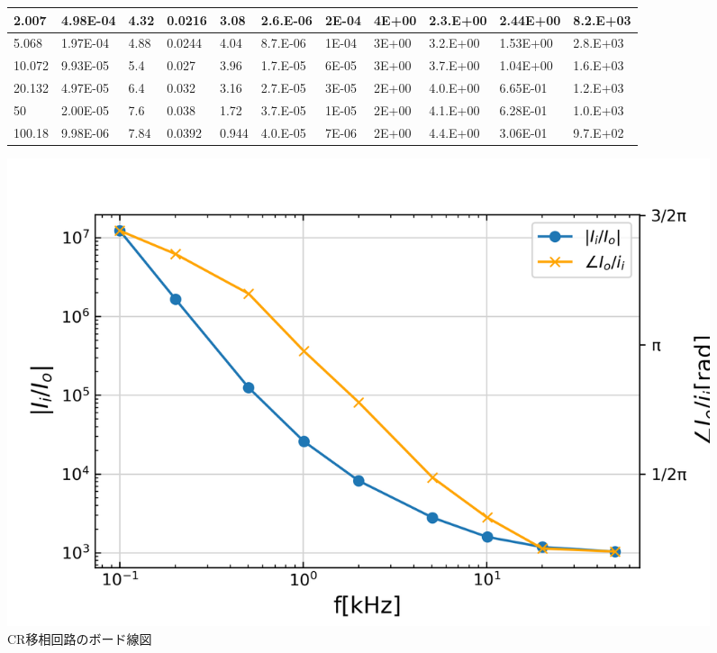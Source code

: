 \documentclass[10pt, a4j, dvipdfmx]{jarticle}
\makeatletter
\newcommand{\figcaption}[1]{\def\@captype{figure}\caption{#1}}
\makeatother
\begin{document}
\begin{figure}[H]
\begin{tabular}{|l|l|l|l|l|l|l|l|l|l|l|}
            2.007                       & 4.98E-04                     & 4.32                       & 0.0216                     & 3.08                        & 2.6.E-06                   & 2E-04     & 4E+00      & 2.3.E+00    & 2.44E+00 & 8.2.E+03 \\ \hline
            5.068                       & 1.97E-04                     & 4.88                       & 0.0244                     & 4.04                        & 8.7.E-06                   & 1E-04     & 3E+00      & 3.2.E+00    & 1.53E+00 & 2.8.E+03 \\ \hline
            10.072                      & 9.93E-05                     & 5.4                        & 0.027                      & 3.96                        & 1.7.E-05                   & 6E-05     & 3E+00      & 3.7.E+00    & 1.04E+00 & 1.6.E+03 \\ \hline
            20.132                      & 4.97E-05                     & 6.4                        & 0.032                      & 3.16                        & 2.7.E-05                   & 3E-05     & 2E+00      & 4.0.E+00    & 6.65E-01 & 1.2.E+03 \\ \hline
            50                          & 2.00E-05                     & 7.6                        & 0.038                      & 1.72                        & 3.7.E-05                   & 1E-05     & 2E+00      & 4.1.E+00    & 6.28E-01 & 1.0.E+03 \\ \hline
            100.18                      & 9.98E-06                     & 7.84                       & 0.0392                     & 0.944                       & 4.0.E-05                   & 7E-06     & 2E+00      & 4.4.E+00    & 3.06E-01 & 9.7.E+02 \\ \hline
            \end{tabular}
        \end{figure}
        \normalsize
        \begin{figure}[H]
            \centering
            \includegraphics[width=\hsize]{ex_1.png}
            \figcaption{CR移相回路のボード線図}
            \label{fig:ex-1}
        \end{figure}
\end{document}
